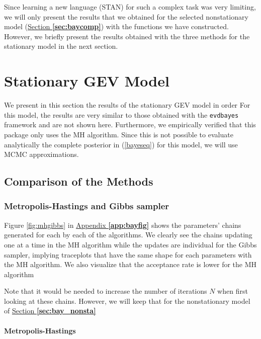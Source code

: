 Since learning a new language (STAN) for such a complex task was very limiting, we will only present the results that we obtained for the selected nonstationary model (\hyperref[sec:baycomp]{Section \textbf{\ref{sec:baycomp}}}) with the functions we have constructed. However, we briefly present the results obtained with the three methods for the stationary model in the next section. 


\section{Stationary GEV Model}\label{sec:baystatio}


We present in this section the results of the stationary GEV model in order 
For this model, the results are very similar to those obtained with the \texttt{evdbayes} framework and are not shown here. Furthermore, we empirically verified that this package only uses the MH algorithm.
Since this is not possible to evaluate analytically the complete posterior in (\ref{bayeseq}) for this model, we will use MCMC approximations. 

\subsection{Comparison of the Methods}


\subsubsection*{Metropolis-Hastings and Gibbs sampler}


Figure \ref{fig:mhgibbs} in \hyperref[app:bayfig]{Appendix \textbf{\ref{app:bayfig}}}
shows the parameters' chains generated for each by each of the algorithms. 
We clearly see the chains updating one at a time in the MH algorithm while the updates are individual for the Gibbs sampler, implying traceplots that have the same shape for each parameters with the MH algorithm. We also visualize that the acceptance rate is lower for the MH algorithm

Note that it would be needed to increase the number of iterations $N$ when first looking at these chains. However, we will keep that for the nonstationary model of \hyperref[sec:bay_nonsta]{Section \textbf{\ref{sec:bay_nonsta}}}


\paragraph*{Metropolis-Hastings}

